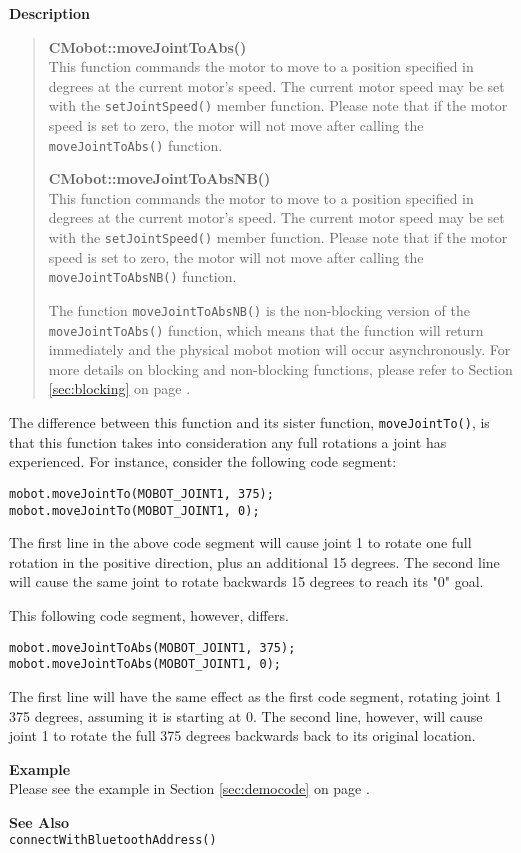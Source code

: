 \noindent
{\bf Description}\\
\vspace{-12pt}
\begin{quote}
{\bf CMobot::moveJointToAbs()}\\
This function commands the motor to move to a position specified in degrees at
the current motor's speed. The current motor speed may be set with the
\texttt{setJointSpeed()} member function. Please note that if the motor speed
is set to zero, the motor will not move after calling the
\texttt{moveJointToAbs()} function. 

{\bf CMobot::moveJointToAbsNB()}\\
This function commands the motor to move to a position specified in degrees at
the current motor's speed. The current motor speed may be set with the
\texttt{setJointSpeed()} member function. Please note that if the motor speed
is set to zero, the motor will not move after calling the
\texttt{moveJointToAbsNB()} function. 

The function \texttt{moveJointToAbsNB()} is the non-blocking version of
the \texttt{moveJointToAbs()} function, which means that the function will return
immediately and the physical mobot motion will occur asynchronously. For
more details on blocking and non-blocking functions, please refer to 
Section \ref{sec:blocking} on page \pageref{sec:blocking}.\\
\end{quote}

The difference between this function and its sister function, \texttt{moveJointTo()},
is that this function takes into consideration any full rotations a joint has 
experienced. For instance, consider the following code segment:
\begin{verbatim}
mobot.moveJointTo(MOBOT_JOINT1, 375);
mobot.moveJointTo(MOBOT_JOINT1, 0);
\end{verbatim}
The first line in the above code segment will cause joint 1 to rotate one full
rotation in the positive direction, plus an additional 15 degrees. The second
line will cause the same joint to rotate backwards 15 degrees to reach its "0"
goal.

This following code segment, however, differs.
\begin{verbatim}
mobot.moveJointToAbs(MOBOT_JOINT1, 375);
mobot.moveJointToAbs(MOBOT_JOINT1, 0);
\end{verbatim}
The first line will have the same effect as the first code segment, rotating
joint 1 375 degrees, assuming it is starting at 0. The second line, however,
will cause joint 1 to rotate the full 375 degrees backwards back to its original 
location.

\noindent
{\bf Example}\\
Please see the example in Section \ref{sec:democode} on page \pageref{sec:democode}.\\
\noindent

\noindent
{\bf See Also}\\
\texttt{connectWithBluetoothAddress()}

